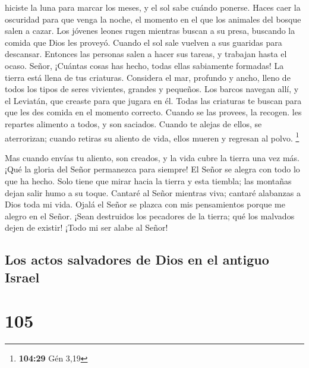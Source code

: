 hiciste la luna para marcar los meses, y el sol sabe cuándo ponerse.
 Haces caer la oscuridad para que venga la noche, el
momento en el que los animales del bosque salen a cazar. 
Los jóvenes leones rugen mientras buscan a su presa, buscando la comida
que Dios les proveyó.  Cuando el sol sale vuelven a sus
guaridas para descansar.  Entonces las personas salen a
hacer sus tareas, y trabajan hasta el ocaso.  Señor,
¡Cuántas cosas has hecho, todas ellas sabiamente formadas! La tierra
está llena de tus criaturas.  Considera el mar, profundo y
ancho, lleno de todos los tipos de seres vivientes, grandes y pequeños.
 Los barcos navegan allí, y el Leviatán, que creaste para
que jugara en él.  Todas las criaturas te buscan para que
les des comida en el momento correcto.  Cuando se las
provees, la recogen. les repartes alimento a todos, y son saciados.
 Cuando te alejas de ellos, se aterrorizan; cuando retiras
su aliento de vida, ellos mueren y regresan al polvo. \footnote{\textbf{104:29}
  Gén 3,19}

 Mas cuando envías tu aliento, son creados, y la vida cubre
la tierra una vez más.  ¡Qué la gloria del Señor permanezca
para siempre! El Señor se alegra con todo lo que ha hecho. 
Solo tiene que mirar hacia la tierra y esta tiembla; las montañas dejan
salir humo a su toque.  Cantaré al Señor mientras viva;
cantaré alabanzas a Dios toda mi vida.  Ojalá el Señor se
plazca con mis pensamientos porque me alegro en el Señor. 
¡Sean destruidos los pecadores de la tierra; qué los malvados dejen de
existir! ¡Todo mi ser alabe al Señor!

\hypertarget{los-actos-salvadores-de-dios-en-el-antiguo-israel}{%
\subsection{Los actos salvadores de Dios en el antiguo
Israel}\label{los-actos-salvadores-de-dios-en-el-antiguo-israel}}

\hypertarget{section-104}{%
\section{105}\label{section-104}}


